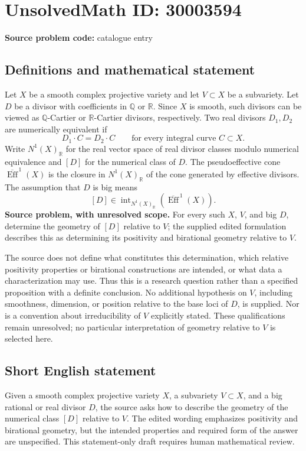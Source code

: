 \documentclass[11pt]{article}
\newcommand{\Q}{\mathbb{Q}}
\newcommand{\R}{\mathbb{R}}
\begin{document}
\section*{UnsolvedMath ID: 30003594}
\textbf{Source problem code:} catalogue entry
\subsection{Definitions and mathematical statement}
Let \(X\) be a smooth complex projective variety and let \(V\subset X\) be a subvariety. Let \(D\) be a divisor with coefficients in \(\Q\) or \(\R\). Since \(X\) is smooth, such divisors can be viewed as \(\Q\)-Cartier or \(\R\)-Cartier divisors, respectively. Two real divisors \(D_1,D_2\) are numerically equivalent if
\[
D_1\cdot C=D_2\cdot C
\qquad\text{for every integral curve }C\subset X.
\]
Write \(N^1(X)_{\R}\) for the real vector space of real divisor classes modulo numerical equivalence and \([D]\) for the numerical class of \(D\). The pseudoeffective cone \(\overline{\operatorname{Eff}}^{\,1}(X)\) is the closure in \(N^1(X)_{\R}\) of the cone generated by effective divisors. The assumption that \(D\) is big means
\[
[D]\in\operatorname{int}_{N^1(X)_{\R}}\!\left(\overline{\operatorname{Eff}}^{\,1}(X)\right).
\]
\textbf{Source problem, with unresolved scope.} For every such \(X\), \(V\), and big \(D\), determine the geometry of \([D]\) relative to \(V\); the supplied edited formulation describes this as determining its positivity and birational geometry relative to \(V\).

The source does not define what constitutes this determination, which relative positivity properties or birational constructions are intended, or what data a characterization may use. Thus this is a research question rather than a specified proposition with a definite conclusion. No additional hypothesis on \(V\), including smoothness, dimension, or position relative to the base loci of \(D\), is supplied. Nor is a convention about irreducibility of \(V\) explicitly stated. These qualifications remain unresolved; no particular interpretation of geometry relative to \(V\) is selected here.
\subsection{Short English statement}
Given a smooth complex projective variety \(X\), a subvariety \(V\subset X\), and a big rational or real divisor \(D\), the source asks how to describe the geometry of the numerical class \([D]\) relative to \(V\). The edited wording emphasizes positivity and birational geometry, but the intended properties and required form of the answer are unspecified. This statement-only draft requires human mathematical review.
\end{document}
